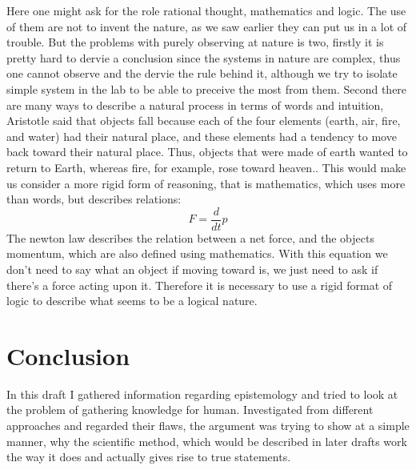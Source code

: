 \documentclass[9pt,a4paper,twocolumn]{article}
\newcounter{def}
\begin{document}
            Here one might ask for the role rational thought, mathematics and logic. The use of them are not to invent the nature, as we saw earlier they can put us in a lot of trouble. But the problems with purely observing at nature is two, firstly it is pretty hard to dervie a conclusion since the systems in nature are complex, thus one cannot observe and the dervie the rule behind it, although we try to isolate simple system in the lab to be able to preceive the most from them. Second there are many ways to describe a natural process in terms of words and intuition,  Aristotle said that objects fall because each of the four elements (earth, air, fire, and water) had their natural place, and these elements had a tendency to move back toward their natural place. Thus, objects that were made of earth wanted to return to Earth, whereas fire, for example, rose toward heaven.\cite{greg-grav}. This would make us consider a more rigid form of reasoning, that is mathematics, which uses more than words, but describes relations:
            \begin{equation}
                F = \frac{d}{dt} p
            \end{equation}
            The newton law describes the relation between a net force, and the objects momentum, which are also defined using mathematics. With this equation we don't need to say what an object if moving toward is, we just need to ask if there's a force acting upon it. Therefore it is necessary to use a rigid format of logic to describe what seems to be a logical nature.

            \section{Conclusion}
            In this draft I gathered information regarding epistemology and tried to look at the problem of gathering knowledge for human. Investigated from different approaches and regarded their flaws, the argument was trying to show at a simple manner, why the scientific method, which would be described in later drafts work the way it does and actually gives rise to true statements.



                       
        \newpage
        
        
\end{document}
